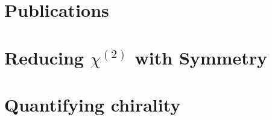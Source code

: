 \documentclass[11pt,a4paper,final]{report}
\begin{document}
\chapter*{Publications}


\bigskip \noindent {}

\bigskip \noindent {}

\bigskip \noindent {}

\bigskip \noindent {}


%










%


\clearpage

\appendix
\chapter{Reducing \texorpdfstring{$\chi^{(2)}$}{Lg} with Symmetry}\label{sec:appendix:rotations}

\chapter{Quantifying chirality}\label{sec:appendix:QuantifyingChirality}

\end{document}
